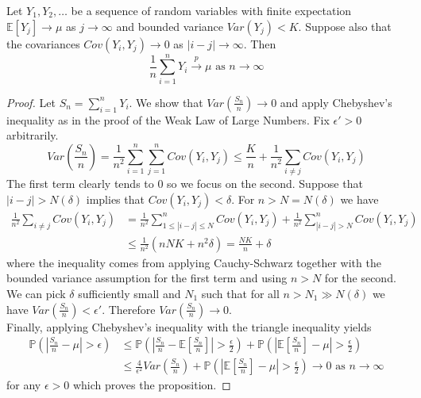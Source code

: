 \documentclass[a4paper]{article}
\renewcommand{\P}{\mathbb P}
\renewcommand{\E}{\mathbb E}
\begin{document}
\begin{proposition}
  Let $Y_1,Y_2, \dots$ be a sequence of random variables with finite expectation $\E[Y_j] \to \mu$ as $j \to \infty$ and bounded variance $Var(Y_j) < K$. Suppose also that the covariances $Cov(Y_i, Y_j) \to 0$ as $|i-j| \to \infty$. Then
  \[\frac{1}{n}\sum_{i = 1}^n Y_i \overset{p}{\longrightarrow} \mu \text{ as } n \to \infty\]
\end{proposition}
\begin{proof}
  Let $S_n = \sum_{i=1}^n Y_i$. We show that $Var\left(\frac{S_n}{n}\right) \to 0$ and apply Chebyshev's inequality as in the proof of the Weak Law of Large Numbers. Fix $\epsilon\prime > 0$ arbitrarily.\\
  \[Var\left(\frac{S_n}{n}\right) = \frac{1}{n^2} \sum_{i=1}^n\sum_{j=1}^n Cov(Y_i, Y_j) \leq \frac{K}{n} + \frac{1}{n^2}\sum_{i \neq j}Cov(Y_i, Y_j)\]
  The first term clearly tends to 0 so we focus on the second. Suppose that $|i-j| > N(\delta)$ implies that $Cov(Y_i, Y_j) < \delta$. For $n > N = N(\delta)$ we have
  \begin{align*}
    \frac{1}{n^2}\sum_{i \neq j}Cov(Y_i, Y_j)&=\frac{1}{n^2}\sum_{1 \leq |i-j| \leq N}^n Cov(Y_i, Y_j) + \frac{1}{n^2}\sum_{|i-j| > N}^n Cov(Y_i, Y_j)\\
    &\leq \frac{1}{n^2}\left(nNK + n^2\delta\right) = \frac{NK}{n} + \delta
  \end{align*}
  where the inequality comes from applying Cauchy-Schwarz together with the bounded variance assumption for the first term and using $n > N$ for the second. We can pick $\delta$ sufficiently small and $N_1$ such that for all $n > N_1 \gg N(\delta)$ we have $Var\left(\frac{S_n}{n}\right) < \epsilon\prime$. Therefore $Var\left(\frac{S_n}{n}\right) \to 0$.\\
  Finally, applying Chebyshev's inequality with the triangle inequality yields
  \begin{align*}
  \P\left(\left| \frac{S_n}{n} - \mu\right| > \epsilon \right) &\leq \P\left(\left| \frac{S_n}{n} - \E\left[\frac{S_n}{n}\right]\right| > \frac{\epsilon}{2} \right) + \P\left(\left| \E\left[\frac{S_n}{n}\right] - \mu\right| > \frac{\epsilon}{2} \right)\\
  &\leq \frac{4}{\epsilon^2}Var\left(\frac{S_n}{n}\right) + \P\left(\left| \E\left[\frac{S_n}{n}\right] - \mu\right| > \frac{\epsilon}{2} \right) \to 0 \text{ as } n \to \infty
\end{align*}
  for any $\epsilon > 0$ which proves the proposition.
\end{proof}
\end{document}
